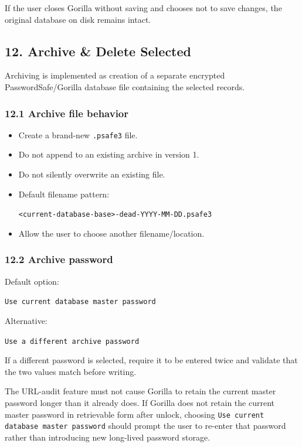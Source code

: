 \documentclass[
  letterpaper,
]{article}
\newcommand{\passthrough}[1]{#1}
\begin{document}
If the user closes Gorilla without saving and chooses not to save changes, the original database on disk remains intact.

\subsection{12. Archive \& Delete Selected}\label{12-archive--delete-selected}

Archiving is implemented as creation of a separate encrypted PasswordSafe/Gorilla database file containing the selected
records.

\subsubsection{12.1 Archive file behavior}\label{121-archive-file-behavior}

\begin{itemize}
\item
  Create a brand-new \passthrough{\lstinline!.psafe3!} file.
\item
  Do not append to an existing archive in version 1.
\item
  Do not silently overwrite an existing file.
\item
  Default filename pattern:

  \nolinkurl{<current-database-base>-dead-YYYY-MM-DD.psafe3}
\item
  Allow the user to choose another filename/location.
\end{itemize}

\subsubsection{12.2 Archive password}\label{122-archive-password}

Default option:

\passthrough{\lstinline!Use current database master password!}

Alternative:

\passthrough{\lstinline!Use a different archive password!}

If a different password is selected, require it to be entered twice and validate that the two values match before
writing.

The URL-audit feature must not cause Gorilla to retain the current master password longer than it already does. If
Gorilla does not retain the current master password in retrievable form after unlock, choosing
\passthrough{\lstinline!Use current database master password!} should prompt the user to re-enter that password rather
than introducing new long-lived password storage.
\end{document}
